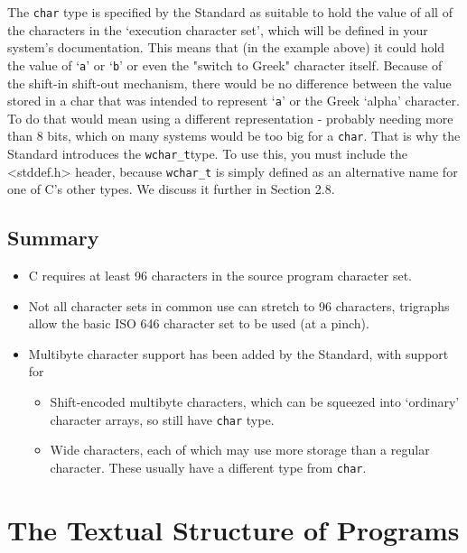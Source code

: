    The \texttt{char} type is specified by the Standard as suitable to
    hold the value of all of the characters in the `execution character
    set', which will be defined in your system's documentation. This means
    that (in the example above) it could hold the value of
    `\texttt{a}' or `\texttt{b}' or even the "switch to
    Greek" character itself. Because of the shift-in shift-out mechanism,
    there would be no difference between the value stored in a char that was
    intended to represent `\texttt{a}' or the Greek `alpha'
    character. To do that would mean using a different representation -
    probably needing more than 8 bits, which on many systems would be too big
    for a \texttt{char}. That is why the Standard introduces the
    \texttt{wchar\_t}type. To use this, you must include the
    <stddef.h> header, because \texttt{wchar\_t} is simply defined as
    an alternative name for one of C's other types. We discuss it further in
    Section 2.8.


  

  \subsection{Summary}

   \begin{itemize}
    \item C requires at least 96 characters in the source program character
     set.
    \item Not all character sets in common use can stretch to 96 characters,
     trigraphs allow the basic ISO 646 character set to be used (at a
     pinch).
    \item Multibyte character support has been added by the Standard, with
     support for
     \begin{itemize}
      \item Shift-encoded multibyte characters, which can be squeezed into
       `ordinary' character arrays, so still have \texttt{char}
       type.
      \item Wide characters, each of which may use more storage than a regular
       character. These usually have a different type from
       \texttt{char}.
     \end{itemize}
    
   \end{itemize}

  

 
        \section{The Textual Structure of Programs}
        

